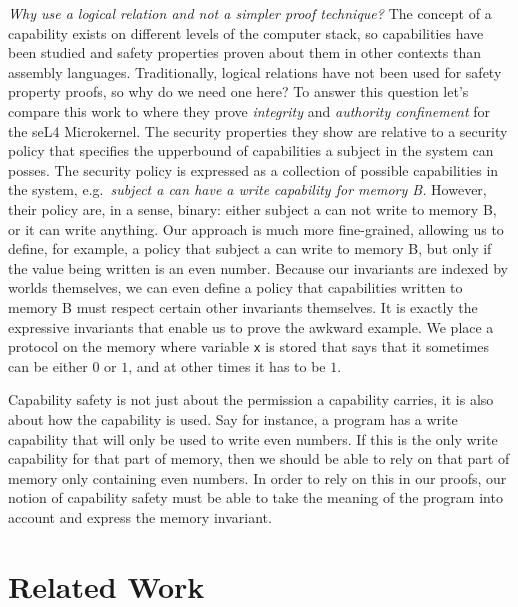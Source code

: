 \documentclass[format=acmsmall, review=true, screen=true]{acmart}
\newenvironment{toplas}%
    {\color{OliveGreen}}{}
\newcommand{\itoplassug}[1]{}
\begin{document}
\begin{toplas}
  \emph{Why use a logical relation and not a simpler proof technique?}
  The concept of a capability exists on different levels of the computer stack, so capabilities have been studied and safety properties proven about them in other contexts than assembly languages.
  Traditionally, logical relations have not been used for safety property proofs, so why do we need one here?
  To answer this question let's compare this work to \citet{sewel_integrity_2011} where they prove \textit{integrity} and \textit{authority confinement} for the seL4 Microkernel.
  The security properties they show are relative to a security policy that specifies the upperbound of capabilities a subject in the system can posses.
  The security policy is expressed as a collection of possible capabilities in the system, e.g.\ \textit{subject a can have a write capability for memory B.}
  However, their policy are, in a sense, binary: either subject a can not write to memory B, or it can write anything.
  Our approach is much more fine-grained, allowing us to define, for example, a policy that subject a can write to memory B, but only if the value being written is an even number.
  Because our invariants are indexed by worlds themselves, we can even define a policy that capabilities written to memory B must respect certain other invariants themselves.
  It is exactly the expressive invariants that enable us to prove the awkward example.
  We place a protocol on the memory where variable \texttt{x} is stored that says that it sometimes can be either $0$ or $1$, and at other times it has to be $1$.
  
  Capability safety is not just about the permission a capability carries, it is also about how the capability is used.
  Say for instance, a program has a write capability that will only be used to write even numbers.
  If this is the only write capability for that part of memory, then we should be able to rely on that part of memory only containing even numbers.
  In order to rely on this in our proofs, our notion of capability safety must be able to take the meaning of the program into account and express the memory invariant.
\end{toplas}
\itoplassug{Reviewer C, popl, would like to know how local capabilities relate to borrowing (see tex comment).}

\section{Related Work}
\label{sec:related-work}
\end{document}
